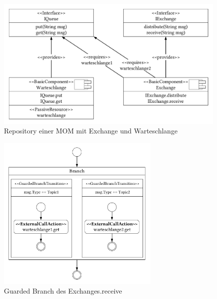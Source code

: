 \begin{figure}
\center
  \includegraphics[width=1\textwidth]{images/modelling/modelingRepository.pdf}
  \caption{Repository einer MOM mit Exchange und Warteschlange}
  \label{img:mom_repository}
\end{figure}

\begin{figure}
\center
  \includegraphics[width=0.7\textwidth]{images/modelling/modelingGuardedBranch.pdf}
  \caption{Guarded Branch des Exchanges.receive}
  \label{img:queueBranch}
\end{figure}

